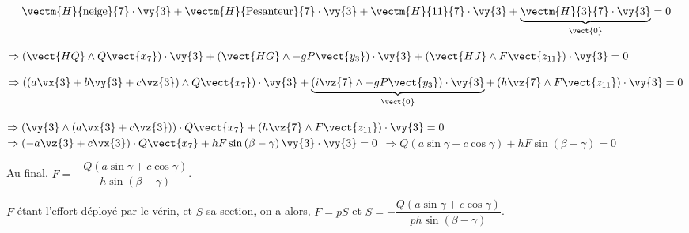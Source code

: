 \begin{corrigebox}
$$
\vectm{H}{\text{neige}}{7} \cdot \vy{3} + \vectm{H}{\text{Pesanteur}}{7} \cdot \vy{3} + \vectm{H}{11}{7} \cdot \vy{3} + \underbrace{\vectm{H}{3}{7} \cdot \vy{3}}_{\vect{0}} =0
$$

$
\Rightarrow
\left(\vect{HQ}\wedge Q\vect{x_7} \right) \cdot \vy{3} 
+ \left(\vect{HG}\wedge -gP\vect{y_3} \right) \cdot \vy{3} 
+ \left(\vect{HJ}\wedge F\vect{z_{11}} \right)  \cdot \vy{3}=0
$

$
\Rightarrow
\left(\left(a\vx{3}+b\vy{3}+c\vz{3}\right)\wedge Q\vect{x_7} \right) \cdot \vy{3} 
+ \underbrace{\left( i\vz{7}\wedge -gP\vect{y_3} \right) \cdot \vy{3}}_{\vect{0}}
+ \left(h\vz{7}\wedge F\vect{z_{11}} \right)  \cdot \vy{3}=0
$

$
\Rightarrow
\left(\vy{3} \wedge \left(a\vx{3}+c\vz{3}\right)  \right) \cdot   Q\vect{x_7}
+ \left(h\vz{7}\wedge F\vect{z_{11}} \right)  \cdot \vy{3}=0
$
$
\Rightarrow
\left( -a\vz{3}+c\vx{3}\right)   \cdot   Q\vect{x_7}
+ hF \sin\left(\beta - \gamma\right)\vy{3}  \cdot \vy{3}=0
$
$
\Rightarrow
Q\left( a\sin \gamma+c\cos\gamma \right)  
+ hF \sin\left(\beta - \gamma\right)=0
$

Au final, $F= - \dfrac{Q\left( a\sin \gamma+c\cos\gamma \right)  }{ h \sin\left(\beta - \gamma\right)}$.

$F$ étant l'effort déployé par le vérin, et $S$ sa section, on a alors, $F=pS$ et 
$S= - \dfrac{Q\left( a\sin \gamma+c\cos\gamma \right)  }{p h \sin\left(\beta - \gamma\right)}$.
\end{corrigebox}

